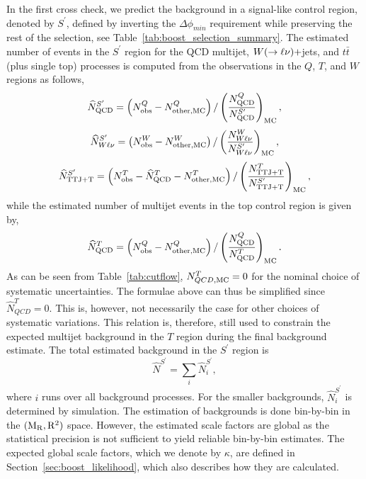 In the first cross check, we predict the background in a signal-like control region, denoted by
$S^\prime$, defined by inverting the $\Delta\phi_{min}$ requirement while preserving the rest of the
selection, see Table~\ref{tab:boost_selection_summary}. 
The estimated number of events in the $S^\prime$ region for the QCD multijet, $W(\rightarrow
\ell\nu)+$jets, and $t\bar{t}$ (plus single top) processes is computed from the observations in the 
$Q$, $T$, and $W$ regions as follows,
\begin{equation}
 \widehat{N}_{\rm QCD}^{S^\prime} = \left( N_{\rm obs}^{Q} - N_{{\rm other, MC}}^{Q} \right)  /
\left(
\frac{N_{\rm QCD}^{Q}}{N_{\rm QCD}^{S^\prime}} \right)_{\rm MC},
\label{eq:E1}
\end{equation}
\begin{equation}
 \widehat{N}_{W\ell\nu}^{S^\prime} = \left( N_{\rm obs}^{W} - N_{\rm other, MC}^{W} \right) /
\left(
\frac{N_{W\ell\nu}^{W}}{N_{W\ell\nu}^{S^\prime}} \right)_{\rm MC},
\label{eq:E2}
\end{equation}
\begin{equation}
  \widehat{N}_{\rm TTJ+T}^{S^\prime} = \left( N_{\rm obs}^{T} - \widehat{N}_{\rm QCD}^{T} - N_{\rm
other, MC}^{T}
\right) / \left( \frac{N_{\rm TTJ+T}^{T}} {N_{\rm TTJ+T}^{S^\prime}}\right)_{\rm MC},
\label{eq:E3}
\end{equation}
while the estimated number of multijet events in the top control region is given by,
\begin{equation}
 \widehat{N}_{\rm QCD}^{T} = \left( N_{\rm obs}^{Q} - N_{\rm other, MC}^{Q} \right) /  \left(
\frac{N_{\rm QCD}^{Q}}{N_{\rm QCD}^{T}} \right)_{\rm MC}.
\label{eq:E4}
\end{equation}
As can be seen from Table~\ref{tab:cutflow}, $N_{QCD, {\rm MC}}^{T} = 0$ for the nominal choice of
systematic uncertainties. The formulae above can thus be simplified since $\widehat{N}_{QCD}^{T} =
0$. This is, however, not necessarily the case for other choices of systematic variations. This
relation is, therefore, still used to constrain the expected multijet background in the $T$ region
during the final background estimate. 
The total estimated background in the $S^\prime$ region is
\begin{equation}
  \hat{N}^{S^\prime} = \sum_i \hat{N}^{S^\prime}_i , 
\end{equation}
where $i$ runs over all background processes.  For the smaller backgrounds, $\hat{N}^{S^\prime}_i$
is determined by simulation. 
The estimation of backgrounds is done bin-by-bin in the $(\mathrm{M_R},\mathrm{R^2})$ space. 
However, the estimated scale factors are global as the statistical precision is not sufficient to
yield reliable bin-by-bin estimates. The expected global scale factors, which we denote by $\kappa$,
 are defined in Section~\ref{sec:boost_likelihood}, which also describes how they are calculated.

